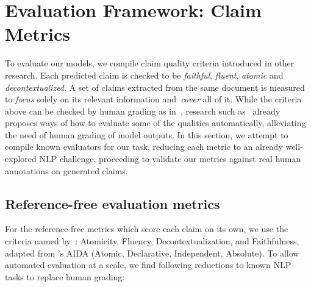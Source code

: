 \section{Evaluation Framework: Claim Metrics}\label{sec:metrics}
To evaluate our models, we compile claim quality criteria introduced in other research.
Each predicted claim is checked to be \textit{faithful}, \textit{fluent}, \textit{atomic} and \textit{decontextualized}.
A set of claims extracted from the same document is measured to \textit{focus} solely on its relevant information and \textit{cover} all of it.
While the criteria above can be checked by human grading as in~\cite{wright-etal-2022-generating}, research such as~\cite{wang-etal-2020-asking,ffci} already proposes ways of how to evaluate some of the qualities automatically, alleviating the need of human grading of model outputs.
In this section, we attempt to compile known evaluators for our task, reducing each metric to an already well-explored NLP challenge, proceeding to validate our metrics against real human annotations on generated claims.

\subsection{Reference-free evaluation metrics}
\label{atomicity}
For the reference-free metrics which score each claim on its own, we use the criteria named by~\citealt{wright-etal-2022-generating}: Atomicity, Fluency, Decontextualization, and Faithfulness, adapted from \citealt{10.1007/978-3-642-38288-8_33}'s AIDA (Atomic, Declarative, Independent, Absolute).
To allow automated evaluation at a scale, we find following reductions to known NLP tasks to replace human grading:

